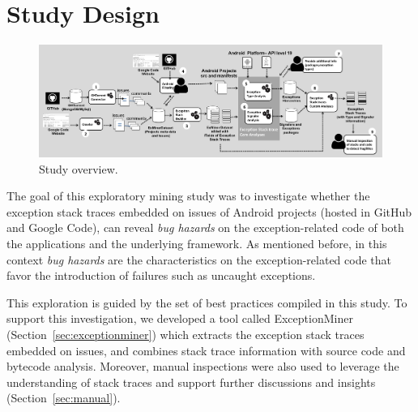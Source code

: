 \documentclass[conference]{IEEEtran}
\begin{document}
\section{Study Design}
\label{sec:study}


\begin{figure} \centering \includegraphics[scale=0.3]{studyoverview3.png}
\caption{Study overview.} \label{fig:overview} \end{figure}


The goal of this exploratory mining study was to investigate whether the exception stack traces 
embedded on issues of Android projects (hosted in GitHub and Google Code), can reveal 
\emph{bug hazards} on the exception-related code of both the applications and the underlying framework. 
As mentioned before, in this context \emph{bug hazards} are the characteristics on the exception-related code 
that favor the introduction of failures such as uncaught exceptions. 

This exploration is guided by the set of best practices compiled in this study.
To support this investigation, we developed a tool called ExceptionMiner (Section~\ref{sec:exceptionminer})
which extracts the exception stack traces embedded on issues, 
and combines stack trace information with source code and bytecode 
analysis. Moreover, manual inspections were also used to leverage
 the understanding of stack traces and support further discussions and insights (Section~\ref{sec:manual}).
\end{document}
